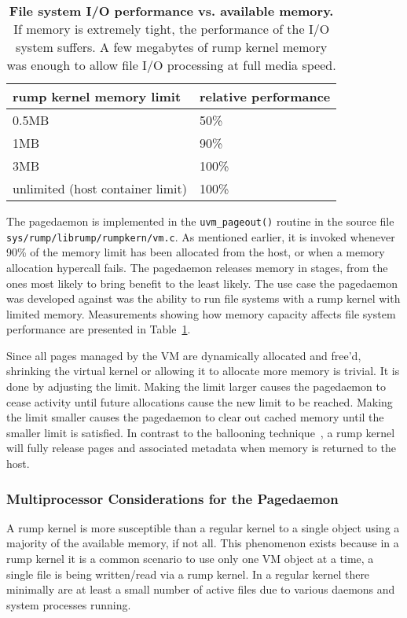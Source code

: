 \begin{table}
\begin{tabular}{|l|l|}
\hline
rump kernel memory limit & relative performance \\
\hline
\hline
0.5MB & 50\% \\
\hline
1MB & 90\% \\
\hline
3MB & 100\% \\
\hline
unlimited (host container limit) & 100\% \\
\hline
\end{tabular}
\caption[File system I/O performance vs. available memory]{
\textbf{File system I/O performance vs. available memory.} If memory
is extremely tight, the performance of the I/O system suffers.  A few
megabytes of rump kernel memory was enough to allow file I/O
processing at full media speed.
}
\label{tab:fileio}
\end{table}

The pagedaemon is implemented in the \verb+uvm_pageout()+ routine
in the source file \texttt{sys/rump/librump/rumpkern/vm.c}.
As mentioned earlier, it is invoked whenever 90\% of the memory
limit has been allocated from the host, or when a memory allocation
hypercall fails.  The pagedaemon releases memory in stages, from
the ones most likely to bring benefit to the least likely.  The
use case the pagedaemon was developed against was the ability to
run file systems with a rump kernel with limited memory.  Measurements
showing how memory capacity affects file system performance are
presented in Table~\ref{tab:fileio}.

Since all pages managed by the VM are dynamically allocated and
free'd, shrinking the virtual kernel or allowing it to allocate
more memory is trivial.  It is done by adjusting the limit.  Making
the limit larger causes the pagedaemon to cease activity until
future allocations cause the new limit to be reached.  Making the
limit smaller causes the pagedaemon to clear out cached memory
until the smaller limit is satisfied.  In contrast to the ballooning
technique~\cite{waldspurger:ballooning}, a rump kernel will fully
release pages and associated metadata when memory is returned to
the host.

\subsubsection*{Multiprocessor Considerations for the Pagedaemon}

A rump kernel is more susceptible than a regular kernel to a single
object using a majority of the available memory, if not all.  This
phenomenon exists because in a rump kernel it is a common scenario to
use only one VM object at a time, \eg a single file is being written/read
via a rump kernel.  In a regular kernel there minimally are at least a
small number of active files due to various daemons and system processes
running.

